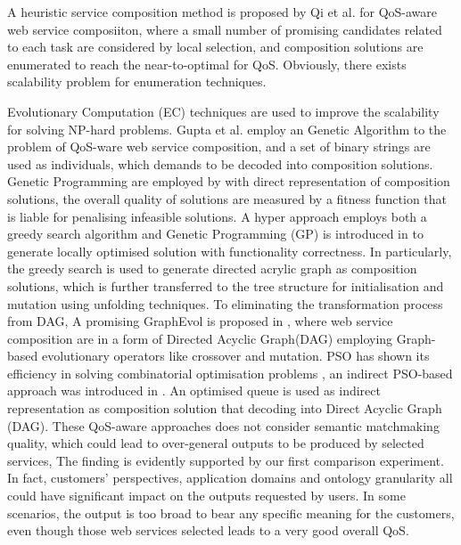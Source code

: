\documentclass{IEEEtran}
\begin{document}
A heuristic service composition method is proposed by Qi et al. \cite{qi2010combining} for QoS-aware web service composiiton, where a small number of promising candidates related to each task are considered by local selection, and composition solutions are enumerated to reach the near-to-optimal for QoS. Obviously, there exists scalability problem for enumeration techniques. 

Evolutionary Computation (EC) techniques are used to improve the scalability for solving NP-hard problems. Gupta et al. \cite{gupta2015optimization} employ an Genetic Algorithm to the problem of QoS-ware web service composition, and a set of binary strings are used as individuals, which demands to be decoded into composition solutions. Genetic Programming are employed by  \cite{yu2013adaptive} with direct representation of composition solutions, the overall quality of solutions are measured by a fitness function that is liable for penalising infeasible solutions. A hyper approach employs both a greedy search algorithm and Genetic Programming (GP) is introduced in \cite{ma2015hybrid} to generate locally optimised solution with functionality correctness. In particularly, the greedy search is used to generate directed acrylic graph as composition solutions, which is further transferred to the tree structure for initialisation and mutation using unfolding techniques. To eliminating the transformation process from DAG, A promising GraphEvol is proposed in \cite{da2015graphevol}, where web service composition are in a form of Directed Acyclic Graph(DAG) employing Graph-based evolutionary operators like crossover and mutation. PSO has shown its efficiency in solving combinatorial optimisation problems \cite{fukuyama2008fundamentals}, an indirect PSO-based approach was introduced in \cite{da2016particle}. An optimised queue is used as indirect representation as composition solution that decoding into Direct Acyclic Graph (DAG). These QoS-aware approaches does not consider semantic matchmaking quality, which could lead to over-general outputs to be produced by selected services, The finding is evidently supported by our first comparison experiment. In fact, customers' perspectives, application domains and ontology granularity all could have significant impact on the outputs requested by users. In some scenarios, the output is too broad to bear any specific meaning for the customers, even though those web services selected leads to a very good overall QoS.
\end{document}
